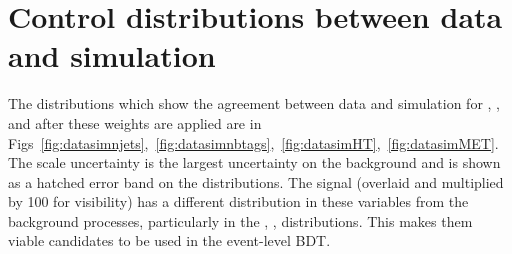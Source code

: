 









\section{Control distributions between data and simulation}


The distributions which show the agreement between data and simulation for \njets, \nbtags, \HT and \MET after these weights are applied are in Figs~\ref{fig:datasimnjets},~\ref{fig:datasimnbtags},~\ref{fig:datasimHT},~\ref{fig:datasimMET}. The scale uncertainty is the largest uncertainty on the background and is shown as a hatched error band on the distributions. The signal (overlaid and multiplied by 100 for visibility) has a different distribution in these variables from the background processes, particularly in the \njets, \nbtags, \HT distributions. This makes them viable candidates to be used in the event-level BDT.

